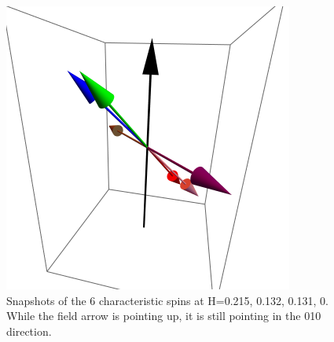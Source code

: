 \documentclass{article}
\begin{document}
\begin{figure}[ht]
\includegraphics[scale=0.35]{HVariedData/Pictures/010Dec216.png}
\caption{Snapshots of the 6 characteristic spins at H=0.215, 0.132, 0.131, 0. While the field arrow is pointing up,
it is still pointing in the 010 direction.}
\end{figure}
\clearpage
\end{document}
